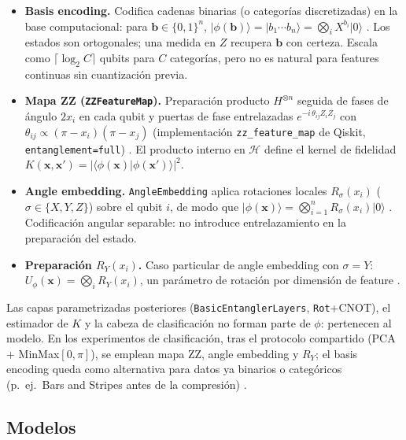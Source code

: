 \begin{itemize}
    \item \textbf{Basis encoding.} Codifica cadenas binarias (o categorías discretizadas) en la base computacional: para $\mathbf{b}\in\{0,1\}^{n}$, $\lvert\phi(\mathbf{b})\rangle=\lvert b_1\cdots b_n\rangle=\bigotimes_{i}X^{b_i}\lvert 0\rangle$ \citep{parateEncodingGuide, pennylaneGlossaryEmbedding, pennylaneEmbedBlog}. Los estados son ortogonales; una medida en $Z$ recupera $\mathbf{b}$ con certeza. Escala como $\lceil\log_2 C\rceil$ qubits para $C$ categorías, pero no es natural para features continuas sin cuantización previa.
    \item \textbf{Mapa ZZ (\texttt{ZZFeatureMap}).} Preparación producto $H^{\otimes n}$ seguida de fases de ángulo $2x_i$ en cada qubit y puertas de fase entrelazadas $e^{-i\,\theta_{ij}Z_iZ_j}$ con $\theta_{ij}\propto(\pi-x_i)(\pi-x_j)$ (implementación \texttt{zz\_feature\_map} de Qiskit, \texttt{entanglement=full}) \citep{havlicek2019}. El producto interno en $\mathcal{H}$ define el kernel de fidelidad $K(\mathbf{x},\mathbf{x}')=\lvert\langle\phi(\mathbf{x})\vert\phi(\mathbf{x}')\rangle\rvert^{2}$.
    \item \textbf{Angle embedding.} \texttt{AngleEmbedding} aplica rotaciones locales $R_{\sigma}(x_i)$ ($\sigma\in\{X,Y,Z\}$) sobre el qubit $i$, de modo que $\lvert\phi(\mathbf{x})\rangle=\bigotimes_{i=1}^{n}R_{\sigma}(x_i)\lvert 0\rangle$ \citep{pennylaneGlossaryEmbedding, pennylaneVariationalClassifier, parateEncodingGuide}. Codificación angular separable: no introduce entrelazamiento en la preparación del estado.
    \item \textbf{Preparación $R_Y(x_i)$.} Caso particular de angle embedding con $\sigma=Y$: $U_{\phi}(\mathbf{x})=\bigotimes_{i}R_Y(x_i)$, un parámetro de rotación por dimensión de feature \citep{pennylaneVariationalClassifier, cerezo2021}.
\end{itemize}

Las capas parametrizadas posteriores (\texttt{BasicEntanglerLayers}, \texttt{Rot}+CNOT), el estimador de $K$ y la cabeza de clasificación no forman parte de $\phi$: pertenecen al modelo. En los experimentos de clasificación, tras el protocolo compartido (PCA + MinMax$[0,\pi]$), se emplean mapa ZZ, angle embedding y $R_Y$; el basis encoding queda como alternativa para datos ya binarios o categóricos (p.~ej.\ Bars and Stripes antes de la compresión) \citep{parateEncodingGuide}.

\subsection{Modelos}

